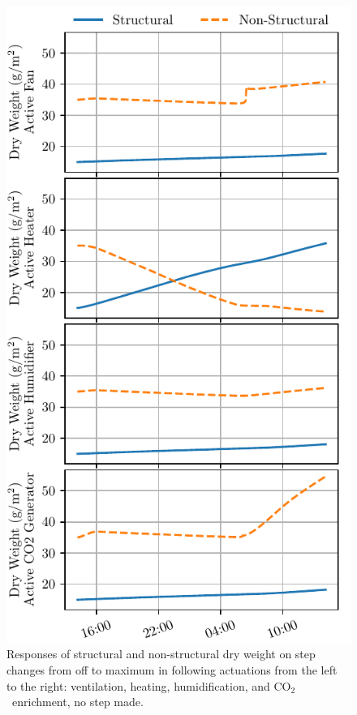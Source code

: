 \documentclass[conference]{IEEEtran}
\newcommand{\coo}{\ensuremath{\mathrm{CO_2}}}
\begin{document}
\begin{figure}
    \centering
    \includegraphics[]{figures/step_response-outputs-2024-10-11_2024-10-26-120s.pdf}
    \caption{Responses of structural and non-structural dry weight on step changes from off to maximum in following actuations from the left to the right: ventilation, heating, humidification, and \coo\ enrichment, no step made.}\label{fig:steps}
\end{figure}
\end{document}
